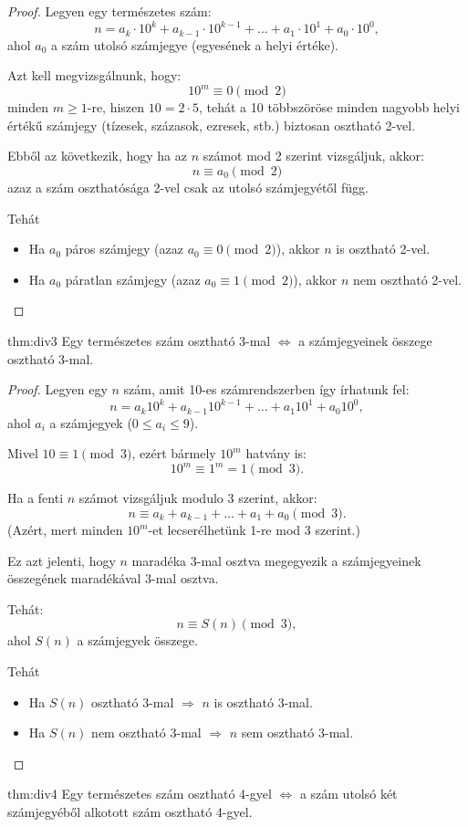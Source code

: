 \begin{proof}
Legyen egy természetes szám: 
\[
n=a_{k}\cdot10^{k}+a_{k-1}\cdot10^{k-1}+\dots+a_{1}\cdot10^{1}+a_{0}\cdot10^{0},
\]
ahol $a_{0}$ a szám utolsó számjegye (egyesének a helyi értéke).

Azt kell megvizsgálnunk, hogy: 
\[
10^{m}\equiv0\pmod 2
\]
minden $m\geq1$-re, hiszen $10=2\cdot5$, tehát a 10 többszöröse
minden nagyobb helyi értékű számjegy (tízesek, százasok, ezresek,
stb.) biztosan osztható 2-vel.

Ebből az következik, hogy ha az $n$ számot mod 2 szerint vizsgáljuk,
akkor: 
\[
n\equiv a_{0}\pmod 2
\]
azaz a szám oszthatósága 2-vel csak az utolsó számjegyétől függ.

Tehát
\begin{itemize}
\item Ha $a_{0}$ páros számjegy (azaz $a_{0}\equiv0\pmod 2$), akkor $n$
is osztható 2-vel.
\item Ha $a_{0}$ páratlan számjegy (azaz $a_{0}\equiv1\pmod 2$), akkor
$n$ nem osztható 2-vel.
\end{itemize}
\end{proof}
\begin{theorem}{thm:div3}
Egy természetes szám osztható 3-mal $\iff$ a számjegyeinek
összege osztható 3-mal.
\end{theorem}

\begin{proof}
Legyen egy $n$ szám, amit 10-es számrendszerben így írhatunk fel:
\[
n=a_{k}10^{k}+a_{k-1}10^{k-1}+\dots+a_{1}10^{1}+a_{0}10^{0},
\]
ahol $a_{i}$ a számjegyek ($0\leq a_{i}\leq9$).

Mivel $10\equiv1\pmod 3$, ezért bármely $10^{m}$ hatvány is: 
\[
10^{m}\equiv1^{m}=1\pmod 3.
\]

Ha a fenti $n$ számot vizsgáljuk modulo 3 szerint, akkor: 
\[
n\equiv a_{k}+a_{k-1}+\dots+a_{1}+a_{0}\pmod 3.
\]
(Azért, mert minden $10^{m}$-et lecserélhetünk 1-re mod 3 szerint.)

Ez azt jelenti, hogy $n$ maradéka 3-mal osztva megegyezik a számjegyeinek
összegének maradékával 3-mal osztva.

Tehát: 
\[
n\equiv S(n)\pmod 3,
\]
ahol $S(n)$ a számjegyek összege.

Tehát
\begin{itemize}
\item Ha $S(n)$ osztható 3-mal $\Rightarrow$ $n$ is osztható 3-mal.
\item Ha $S(n)$ nem osztható 3-mal $\Rightarrow$ $n$ sem osztható 3-mal.
\end{itemize}
\end{proof}
\begin{theorem}{thm:div4}
Egy természetes szám osztható 4-gyel $\iff$ a szám utolsó két számjegyéből
alkotott szám osztható 4-gyel.
\end{theorem}


